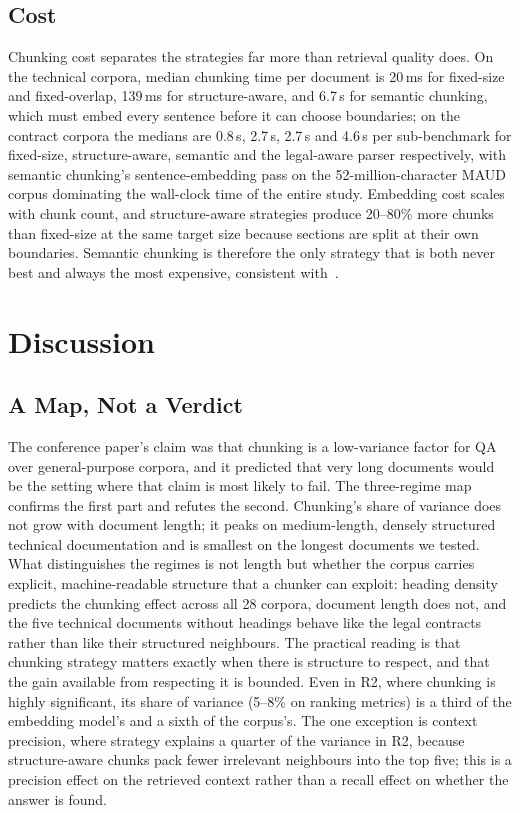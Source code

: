 \documentclass[runningheads]{llncs}
\begin{document}
\subsection{Cost}
\label{sec:cost}
Chunking cost separates the strategies far more than retrieval quality does. On the technical corpora, median chunking time per document is 20\,ms for fixed-size and fixed-overlap, 139\,ms for structure-aware, and 6.7\,s for semantic chunking, which must embed every sentence before it can choose boundaries; on the contract corpora the medians are 0.8\,s, 2.7\,s, 2.7\,s and 4.6\,s per sub-benchmark for fixed-size, structure-aware, semantic and the legal-aware parser respectively, with semantic chunking's sentence-embedding pass on the 52-million-character MAUD corpus dominating the wall-clock time of the entire study. Embedding cost scales with chunk count, and structure-aware strategies produce 20--80\% more chunks than fixed-size at the same target size because sections are split at their own boundaries. Semantic chunking is therefore the only strategy that is both never best and always the most expensive, consistent with~\cite{qu2025semantic}.

\section{Discussion}
\label{sec:discussion}

\subsection{A Map, Not a Verdict}
The conference paper's claim was that chunking is a low-variance factor for QA over general-purpose corpora, and it predicted that very long documents would be the setting where that claim is most likely to fail. The three-regime map confirms the first part and refutes the second. Chunking's share of variance does not grow with document length; it peaks on medium-length, densely structured technical documentation and is smallest on the longest documents we tested. What distinguishes the regimes is not length but whether the corpus carries explicit, machine-readable structure that a chunker can exploit: heading density predicts the chunking effect across all 28 corpora, document length does not, and the five technical documents without headings behave like the legal contracts rather than like their structured neighbours. The practical reading is that chunking strategy matters exactly when there is structure to respect, and that the gain available from respecting it is bounded. Even in R2, where chunking is highly significant, its share of variance (5--8\% on ranking metrics) is a third of the embedding model's and a sixth of the corpus's. The one exception is context precision, where strategy explains a quarter of the variance in R2, because structure-aware chunks pack fewer irrelevant neighbours into the top five; this is a precision effect on the retrieved context rather than a recall effect on whether the answer is found.
\end{document}

